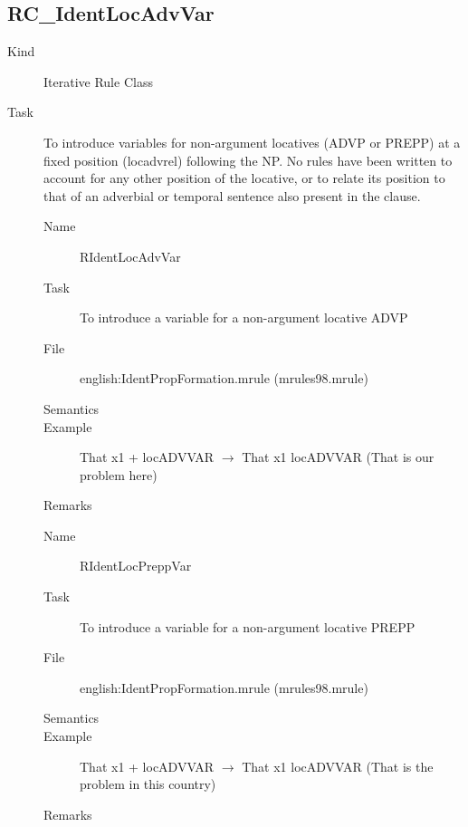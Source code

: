 \newpage
\subsection{RC\_IdentLocAdvVar}
\begin{description}
\item[Kind] Iterative Rule Class
\item[Task] To introduce variables for non-argument locatives (ADVP or PREPP) 
at a fixed position (locadvrel) following the NP. No rules have been 
written to account for any other position 
of the locative, or to relate its position to that of an adverbial or temporal 
sentence also present in the clause.

\vspace{1 cm}
\begin{description}
\item[Name] RIdentLocAdvVar
\item[Task] To introduce a variable for a non-argument locative ADVP 
\item[File] english:IdentPropFormation.mrule (mrules98.mrule)
\item[Semantics]
\item[Example] That x1 + locADVVAR $\rightarrow$ That x1 locADVVAR
(That is our problem here)
\item[Remarks]
\end{description}

\vspace{1 cm}
\begin{description}
\item[Name] RIdentLocPreppVar
\item[Task] To introduce a variable for a non-argument locative PREPP
\item[File] english:IdentPropFormation.mrule (mrules98.mrule)
\item[Semantics]
\item[Example] That x1 + locADVVAR $\rightarrow$ That x1 locADVVAR
(That is the problem in this country)
\item[Remarks]
\end{description}

\end{description}



